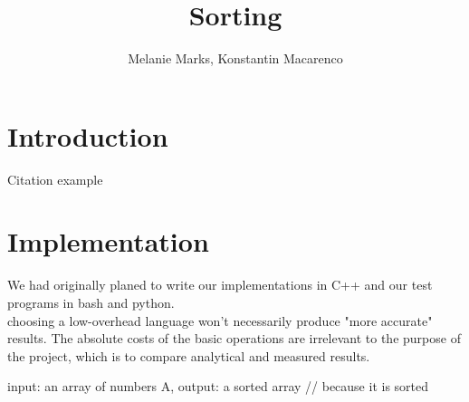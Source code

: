 \documentclass{article}
\title{Sorting}
\author{
    Melanie Marks, Konstantin Macarenco\\
}
\begin{document}
\maketitle
\thispagestyle{plain}
\pagestyle{plain}
\begin{abstract}

\end{abstract}
\tableofcontents
\section{Introduction}\label{sec:intro}
Citation example\cite{ABOOK}


\pagebreak
\section{Implementation}\label{sec:Implementation}
We had originally planed to write our implementations in C++ and our test programs in bash and python.  \\
choosing a low-overhead language won't necessarily produce "more accurate" results.  The absolute costs of the basic operations are irrelevant to the purpose of the project, which is to compare analytical and measured results.

\begin{algorithm}[h!]
    \begin{algorithmic}[1]
         {input:  an array of numbers A, output: a sorted array}
                \State{}  // because it is sorted
            \EndIf
            \State{}
        \EndFunction{}
    \end{algorithmic}
\end{algorithm}
\begin{algorithm}[h!]
    \begin{algorithmic}[1]
                \Else{}
                \EndIf
            \EndWhile
            \EndWhile
            \EndWhile
            \State{}
        \EndFunction{}
    \end{algorithmic}
\end{algorithm}
\end{document}
